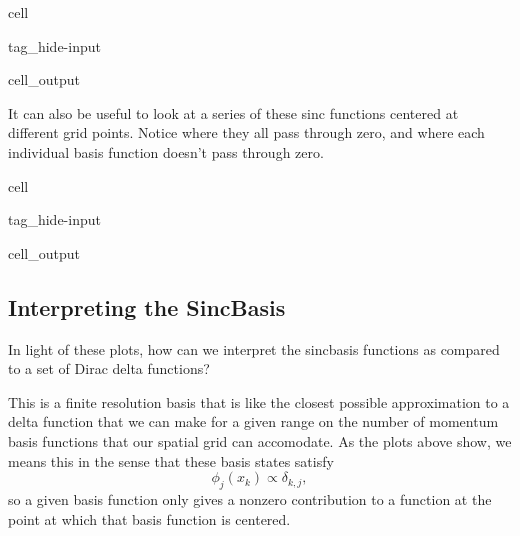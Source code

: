 \documentclass[letterpaper,10pt,english]{jupyterBook}
\begin{document}
\begin{sphinxuseclass}{cell}
\begin{sphinxuseclass}{tag_hide-input}\begin{sphinxVerbatimOutput}

\begin{sphinxuseclass}{cell_output}
\noindent{}

\end{sphinxuseclass}\end{sphinxVerbatimOutput}

\end{sphinxuseclass}
\end{sphinxuseclass}
\sphinxAtStartPar
It can also be useful to look at a series of these sinc functions centered at different grid points. Notice where they all pass through zero, and where each individual basis function doesn’t pass through zero.

\begin{sphinxuseclass}{cell}
\begin{sphinxuseclass}{tag_hide-input}\begin{sphinxVerbatimOutput}

\begin{sphinxuseclass}{cell_output}
\noindent{}

\end{sphinxuseclass}\end{sphinxVerbatimOutput}

\end{sphinxuseclass}
\end{sphinxuseclass}

\subsection{Interpreting the Sinc\sphinxhyphen{}Basis}
\label{\detokenize{Section4_v2:interpreting-the-sinc-basis}}
\sphinxAtStartPar
{} In light of these plots, how can we interpret the sinc\sphinxhyphen{}basis functions as compared to a set of Dirac delta functions?

\sphinxAtStartPar
{} This is a finite resolution basis that is like the closest possible approximation to a delta function that we can make for a given range on the number of momentum basis functions that our spatial grid can accomodate. As the plots above show, we means this in the sense that these basis states satisfy
\label{equation:Section4_v2:e2034f23-a7c7-41a7-88e3-9c47de4b9463}\begin{equation}
\phi_j(x_k) \propto \delta_{k,j},
\end{equation}
\sphinxAtStartPar
so a given basis function only gives a nonzero contribution to a function at the point at which that basis function is centered.
\end{document}
